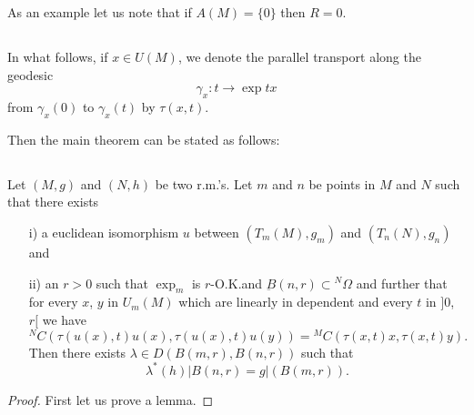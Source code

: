 \begin{example*}
As \pageoriginale an example let us note that if $A(M)=\{0\}$ then
$R=0$. 
\end{example*}

\setcounter{subsection}{9}
\subsection{}\label{chap6:6.4.10}
In what follows, if $x\in U(M)$, we denote the parallel transport
along the geodesic
$$
\gamma_{x}:t\to \exp tx
$$
from $\gamma_{x}(0)$ to $\gamma_{x}(t)$ by $\tau(x,t)$.

Then the main theorem can be stated as follows:

\setcounter{subsection}{10}

\subsection{}\label{chap6:6.4.11}

\begin{theorem*}
Let $(M,g)$ and $(N,h)$ be two r.m.'s. Let $m$ and $n$ be points in
$M$ and $N$ such that there exists
\begin{itemize}
\item[\rm i)] a euclidean isomorphism $u$ between $(T_{m}(M),g_{m})$
  and $(T_{n}(N),g_{n})$ and

\item[\rm ii)] an $r>0$ such that $\exp_{m}$ is $r$-O.K.\@ and
  $\underbar{B}(n,r)\subset{}^{N}\Omega$ and further that for every
  $x$, $y$ in $U_{m}(M)$ which are linearly in dependent and every $t$
  in $]0$, $r[$ we have
\begin{equation*}
{}^{N}C(\tau(u(x),t)u(x),\tau(u(x),t)u(y))={}^{M}C(\tau(x,t)x,\tau(x,t)y).\tag{6.4.12}\label{chap6:6.4.12} 
\end{equation*}
Then there exists $\lambda \in D(B(m,r),B(n,r))$ such that
$$
\lambda^{\ast}(h)|B(n,r)=g|(B(m,r)).
$$
\end{itemize}
\end{theorem*}

\begin{proof}
First let us prove a lemma.
\end{proof}

\setcounter{subsection}{12}

\subsection{}\label{chap6:6.4.13}

